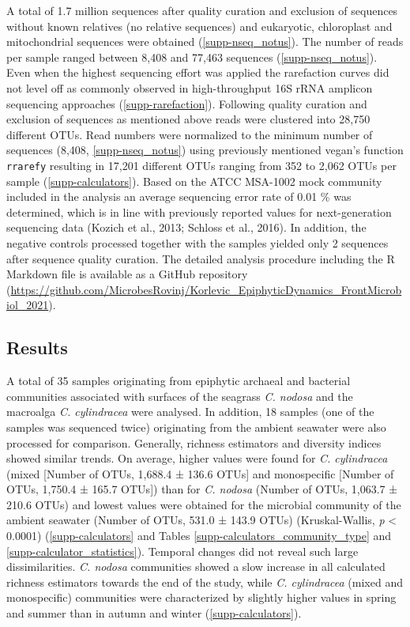 \documentclass[
  12pt,
]{article}
\begin{document}
A total of 1.7 million sequences after quality curation and exclusion of
sequences without known relatives (no relative sequences) and
eukaryotic, chloroplast and mitochondrial sequences were obtained
(\autoref{supp-nseq_notus}). The number of reads per sample ranged
between 8,408 and 77,463 sequences (\autoref{supp-nseq_notus}). Even
when the highest sequencing effort was applied the rarefaction curves
did not level off as commonly observed in high-throughput 16S rRNA
amplicon sequencing approaches (\autoref{supp-rarefaction}). Following
quality curation and exclusion of sequences as mentioned above reads
were clustered into 28,750 different OTUs. Read numbers were normalized
to the minimum number of sequences (8,408, \autoref{supp-nseq_notus})
using previously mentioned vegan's function \texttt{rrarefy} resulting
in 17,201 different OTUs ranging from 352 to 2,062 OTUs per sample
(\autoref{supp-calculators}). Based on the ATCC MSA-1002 mock community
included in the analysis an average sequencing error rate of 0.01
\si{\percent} was determined, which is in line with previously reported
values for next-generation sequencing data (Kozich et al., 2013; Schloss
et al., 2016). In addition, the negative controls processed together
with the samples yielded only 2 sequences after sequence quality
curation. The detailed analysis procedure including the R Markdown file
is available as a GitHub repository
(\url{https://github.com/MicrobesRovinj/Korlevic_EpiphyticDynamics_FrontMicrobiol_2021}).

\newpage

\hypertarget{results}{%
\subsection{Results}\label{results}}

A total of 35 samples originating from epiphytic archaeal and bacterial
communities associated with surfaces of the seagrass \emph{C. nodosa}
and the macroalga \emph{C. cylindracea} were analysed. In addition, 18
samples (one of the samples was sequenced twice) originating from the
ambient seawater were also processed for comparison. Generally, richness
estimators and diversity indices showed similar trends. On average,
higher values were found for \emph{C. cylindracea} (mixed {[}Number of
OTUs, 1,688.4 ± 136.6 OTUs{]} and monospecific {[}Number of OTUs,
1,750.4 ± 165.7 OTUs{]}) than for \emph{C. nodosa} (Number of OTUs,
1,063.7 ± 210.6 OTUs) and lowest values were obtained for the microbial
community of the ambient seawater (Number of OTUs, 531.0 ± 143.9 OTUs)
(Kruskal-Wallis, \emph{p} \textless{} 0.0001)
(\autoref{supp-calculators} and Tables
\ref{supp-calculators_community_type} and
\ref{supp-calculator_statistics}). Temporal changes did not reveal such
large dissimilarities. \emph{C. nodosa} communities showed a slow
increase in all calculated richness estimators towards the end of the
study, while \emph{C. cylindracea} (mixed and monospecific) communities
were characterized by slightly higher values in spring and summer than
in autumn and winter (\autoref{supp-calculators}).
\end{document}
